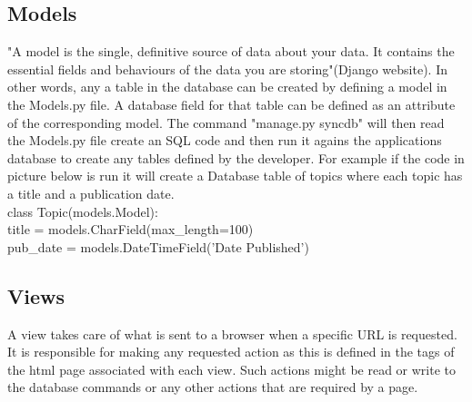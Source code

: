 \documentclass{l3proj}
\begin{document}
\subsection{Models}
"A model is the single, definitive source of data about your data. It contains the essential 
fields and behaviours of the data you are storing"(Django website). In other words, any a 
table in the database can be created by defining a model in the Models.py file. A 
database field for that table can be defined as an attribute of the corresponding model. 
The command "manage.py syncdb" will then read the Models.py file create an SQL code 
and then run it agains the applications database to create any tables defined by the 
developer. 
For example if the code in picture below is run it will create a Database table of topics 
where each topic has a title and a publication date. \\
class Topic(models.Model): \\
title = models.CharField(max\_length=100) \\
pub\_date = models.DateTimeField('Date Published')\\
\subsection{Views}
A view takes care of what is sent to a browser when a specific URL is requested. It is 
responsible for making any requested action as this is defined in the tags of the html 
page associated with each view. Such actions might be read or write to the database 
commands or any other actions that are required by a page.
\end{document}
